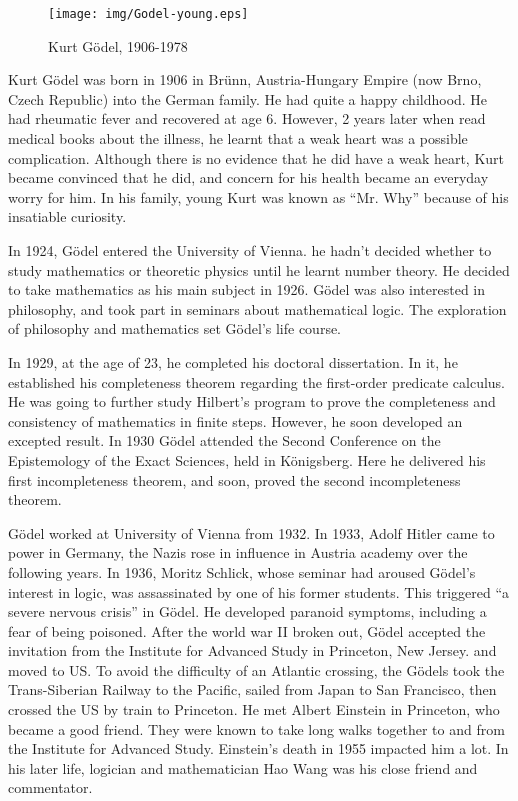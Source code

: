 \documentclass{article}
\begin{document}
\begin{wrapfigure}{L}{0.4\textwidth}
 \centering
 \texttt{[image: img/Godel-young.eps]}
 \captionsetup{labelformat=empty}
 \caption{Kurt Gödel, 1906-1978}
 \label{fig:Godel-young}
\end{wrapfigure}

Kurt Gödel was born in 1906 in Brünn, Austria-Hungary Empire (now Brno, Czech Republic) into the German family. He had quite a happy childhood. He had rheumatic fever and recovered at age 6. However, 2 years later when read medical books about the illness, he learnt that a weak heart was a possible complication. Although there is no evidence that he did have a weak heart, Kurt became convinced that he did, and concern for his health became an everyday worry for him. In his family, young Kurt was known as ``Mr. Why'' because of his insatiable curiosity.

In 1924, Gödel entered the University of Vienna. he hadn't decided whether to study mathematics or theoretic physics until he learnt number theory. He decided to take mathematics as his main subject in 1926. Gödel was also interested in philosophy, and took part in seminars about mathematical logic. The exploration of philosophy and mathematics set Gödel's life course.

In 1929, at the age of 23, he completed his doctoral dissertation. In it, he established his completeness theorem regarding the first-order predicate calculus. He was going to further study Hilbert's program to prove the completeness and consistency of mathematics in finite steps. However, he soon developed an excepted result. In 1930 Gödel attended the Second Conference on the Epistemology of the Exact Sciences, held in Königsberg. Here he delivered his first incompleteness theorem, and soon, proved the second incompleteness theorem.

Gödel worked at University of Vienna from 1932. In 1933, Adolf Hitler came to power in Germany, the Nazis rose in influence in Austria academy over the following years. In 1936, Moritz Schlick, whose seminar had aroused Gödel's interest in logic, was assassinated by one of his former students. This triggered ``a severe nervous crisis'' in Gödel. He developed paranoid symptoms, including a fear of being poisoned. After the world war II broken out, Gödel accepted the invitation from the Institute for Advanced Study in Princeton, New Jersey. and moved to US. To avoid the difficulty of an Atlantic crossing, the Gödels took the Trans-Siberian Railway to the Pacific, sailed from Japan to San Francisco, then crossed the US by train to Princeton. He met Albert Einstein in Princeton, who became a good friend. They were known to take long walks together to and from the Institute for Advanced Study. Einstein's death in 1955 impacted him a lot. In his later life, logician and mathematician Hao Wang was his close friend and commentator.
\end{document}
